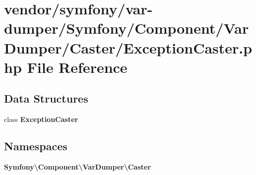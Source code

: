 \section{vendor/symfony/var-\/dumper/\+Symfony/\+Component/\+Var\+Dumper/\+Caster/\+Exception\+Caster.php File Reference}
\label{_exception_caster_8php}
\subsection*{Data Structures}
\begin{DoxyCompactItemize}
\item 
class {\bf Exception\+Caster}
\end{DoxyCompactItemize}
\subsection*{Namespaces}
\begin{DoxyCompactItemize}
\item 
 {\bf Symfony\textbackslash{}\+Component\textbackslash{}\+Var\+Dumper\textbackslash{}\+Caster}
\end{DoxyCompactItemize}
